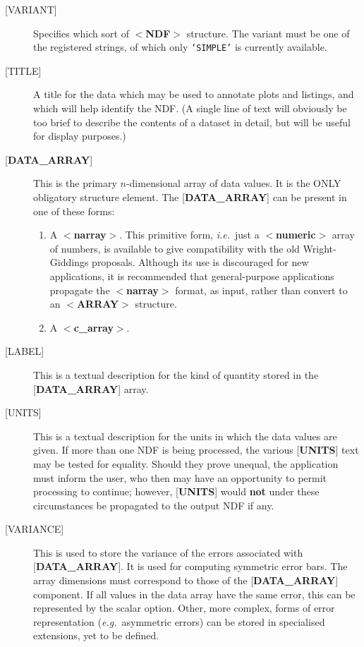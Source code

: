 \begin{description}
\item [{[}VARIANT{]}]  Specifies which
sort of $<${\bf NDF}$>$ structure.  The variant
must be one
of the registered strings, of which only {\tt `SIMPLE'} is currently 
available.
\item [{[}TITLE{]}]  A title for the data which
may be used to annotate plots and
listings, and which will help identify the NDF.
(A single line of text will obviously be too
brief to describe the contents
of a dataset in detail, but will
be useful for display purposes.)
\item [{[}{\bf DATA\_ARRAY}{]}]  This is the primary
$n$-dimensional array of data values.
It is the ONLY obligatory structure element.  The
{[}{\bf DATA\_ARRAY}{]} can be 
present in one of these forms:
\begin{enumerate}
\item A $<${\bf narray}$>$.
This primitive form, {\it i.e.}\ just a $<${\bf numeric}$>$ array of numbers,
is available to give compatibility with the old Wright-Giddings proposals.
Although its
use is discouraged for new applications, it
is recommended that general-purpose applications
propagate the $<${\bf narray}$>$ format, as input,
rather than convert to an
\mbox{$<${\bf ARRAY}$>$} structure.
\item A $<${\bf c\_array}$>$.
\end{enumerate}
\item [{[}LABEL{]}]  This is a textual description for the kind of quantity
stored in the {[}{\bf DATA\_ARRAY}{]} array.
\item [{[}UNITS{]}]  This is a textual description for the units in which the
data values are given. If more than one NDF is being processed, the various
{[}{\bf UNITS}{]} text may be tested for equality.  Should they prove
unequal, the
application must inform the user, who then may have an opportunity to 
permit processing to continue;  however, {[}{\bf UNITS}{]}
would {\bf not} under these circumstances be
propagated to the output NDF if any.
\item [{[}VARIANCE{]}]  This is used to store the variance of the
errors associated with {[}{\bf DATA\_ARRAY}{]}.
It is used for computing symmetric error bars.
The array dimensions must correspond to those of the
{[}{\bf DATA\_ARRAY}{]} component.
If all values in the data array have the same error, this can
be represented by the scalar option. 
Other, more complex, forms of error representation
({\it e.g.}\  asymmetric errors)
can be stored in specialised extensions, yet to be defined.

\end{description}

